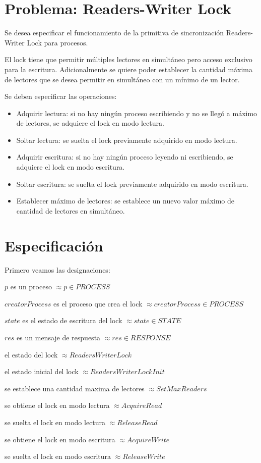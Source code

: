 \documentclass[a4paper, 12pt]{article}
\newcommand{\desig}[2]{\item #1 $\approx #2$}
\newenvironment{designations}
  {\begin{leftbar}
    \begin{list}{}{\setlength{\labelsep}{0cm}
                   \setlength{\labelwidth}{0cm}
                   \setlength{\listparindent}{0cm}
                   \setlength{\rightmargin}{\leftmargin}}}
  {\end{list}\end{leftbar}}
\begin{document}


\pagestyle{fancy}
\renewcommand{\footrulewidth}{0.6pt}


\newpage %
\section{Problema: Readers-Writer Lock}
Se desea especificar el funcionamiento de la primitiva de sincronización Readers-Writer Lock para procesos.

El lock tiene que permitir múltiples lectores en simultáneo pero acceso exclusivo para la escritura. Adicionalmente se quiere poder establecer la cantidad máxima de lectores que se desea permitir en simultáneo con un mínimo de un lector. 

Se deben especificar las operaciones:
\begin{itemize}
    \item Adquirir lectura: si no hay ningún proceso escribiendo y no se llegó a máximo de lectores, se adquiere el lock en modo lectura.
    \item Soltar lectura: se suelta el lock previamente adquirido en modo lectura.
    \item Adquirir escritura: si no hay ningún proceso leyendo ni escribiendo, se adquiere el lock en modo escritura.
    \item Soltar escritura: se suelta el lock previamente adquirido en modo escritura.
    \item Establecer máximo de lectores: se establece un nuevo valor máximo de cantidad de lectores en simultáneo.
\end{itemize}
\newpage
\section{Especificación}
Primero veamos las designaciones:
\begin{designations}
  \desig{$p$ es un proceso}{p \in PROCESS}
  \desig{$creatorProcess$ es el proceso que crea el lock}{creatorProcess \in PROCESS}
  \desig{$state$ es el estado de escritura del lock}{state \in STATE}
  \desig{$res$ es un mensaje de respuesta}{res \in RESPONSE}
  \desig{el estado del lock}{ReadersWriterLock}
  \desig{el estado inicial del lock}{ReadersWriterLockInit}
  \desig{se establece una cantidad maxima de lectores}{SetMaxReaders}
  \desig{se obtiene el lock en modo lectura}{AcquireRead}
  \desig{se suelta el lock en modo lectura}{ReleaseRead}
  \desig{se obtiene el lock en modo escritura}{AcquireWrite}
  \desig{se suelta el lock en modo escritura}{ReleaseWrite}
\end{designations}
\end{document}
